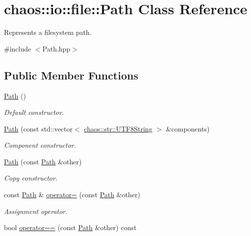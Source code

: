 \hypertarget{classchaos_1_1io_1_1file_1_1_path}{\section{chaos\-:\-:io\-:\-:file\-:\-:Path Class Reference}
\label{classchaos_1_1io_1_1file_1_1_path}
}


Represents a filesystem path.  




{\ttfamily \#include $<$Path.\-hpp$>$}

\subsection*{Public Member Functions}
\begin{DoxyCompactItemize}
\item 
\hyperlink{classchaos_1_1io_1_1file_1_1_path_ae221e8dceeedda7ef0376e408a33b388}{Path} ()
\begin{DoxyCompactList}\small\item\em Default constructor. \end{DoxyCompactList}\item 
\hyperlink{classchaos_1_1io_1_1file_1_1_path_a2f99e6ecbc8012c704a7d59a82e44d7e}{Path} (const std\-::vector$<$ \hyperlink{classchaos_1_1str_1_1_u_t_f8_string}{chaos\-::str\-::\-U\-T\-F8\-String} $>$ \&components)
\begin{DoxyCompactList}\small\item\em Component constructor. \end{DoxyCompactList}\item 
\hyperlink{classchaos_1_1io_1_1file_1_1_path_a888031f678ac29c3c068c7c710057809}{Path} (const \hyperlink{classchaos_1_1io_1_1file_1_1_path}{Path} \&other)
\begin{DoxyCompactList}\small\item\em Copy constructor. \end{DoxyCompactList}\item 
const \hyperlink{classchaos_1_1io_1_1file_1_1_path}{Path} \& \hyperlink{classchaos_1_1io_1_1file_1_1_path_aaac3c1980ffcf11566532646ba1a2a65}{operator=} (const \hyperlink{classchaos_1_1io_1_1file_1_1_path}{Path} \&other)
\begin{DoxyCompactList}\small\item\em Assignment operator. \end{DoxyCompactList}\item 
bool \hyperlink{classchaos_1_1io_1_1file_1_1_path_a68c97c43113acbc525498c97e8a1d64d}{operator==} (const \hyperlink{classchaos_1_1io_1_1file_1_1_path}{Path} \&other) const 

\end{DoxyCompactItemize}
